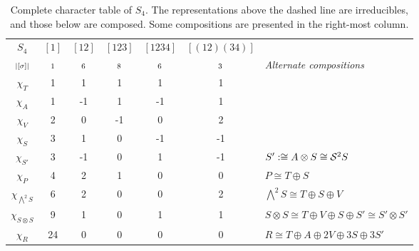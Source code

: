 \begin{table}[hbt!]
	\centering
	\begin{tabular}{c | c c c c c | l}
		$S_4$         & $[1]$   & $[12]$  & $[123]$ & $[1234]$ & $[(12)(34)]$ &                                                              \\
		$\scriptstyle|[\sigma]|$    & $\scriptstyle 1$ & $\scriptstyle 6$ & $\scriptstyle 8$ & $\scriptstyle 6$  & $\scriptstyle 3$      & \textit{Alternate compositions}                              \\ \hline
		$\chi_T$       & 1       & 1       & 1       & 1        & 1            &                                                              \\
		$\chi_A$       & 1       & -1      & 1       & -1       & 1            &                                                              \\
		$\chi_V$       & 2       & 0       & -1      & 0        & 2            &                                                              \\
		$\chi_S$       & 3       & 1       & 0       & -1       & -1           &                                                              \\
		$\chi_{S'}$ & 3       & -1      & 0       & 1        & -1           & $S' :\cong A \otimes S \cong \mathcal{S}^2S$                                  \\ \hline\hline
		$\chi_P$       & 4       & 2       & 1       & 0        & 0            & $P \cong T \oplus S$                                         \\
		$\chi_{\bigwedge^2S}$    & 6       & 2       & 0       & 0        & 2            & $\bigwedge^2S \cong T \oplus S \oplus V$                     \\
		$\chi_{S \otimes S}$ & 9       & 1       & 0       & 1        & 1            & $S \otimes S \cong T \oplus V \oplus S \oplus S' \cong S' \otimes S'$ \\
		$\chi_R$       & 24      & 0       & 0       & 0        & 0            & $R \cong T \oplus A \oplus 2V \oplus 3S \oplus 3S'$
	\end{tabular}
	\caption{Complete character table of $S_4$. The representations above the dashed line are irreducibles, and those below are composed. Some compositions are presented in the right-most column.}
	\label{table:completecharS4}
\end{table}

